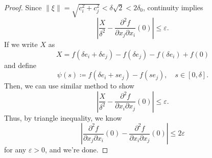\begin{proof}
    Since \(\lVert \xi  \rVert = \sqrt{c_i^2 + c_j^2} < \delta \sqrt{2} < 2 \delta _0   \), continuity implies 
    \[
        \left\vert \frac{X}{\delta ^2} - \frac{\partial^2 f}{\partial x_j \partial x_i}(0)  \right\vert \le \varepsilon. 
    \]
    If we write \(X\) as 
    \[
        X = f(\delta e_i + \delta e_j) - f(\delta e_j) - f(\delta e_i) + f(0)
    \] 
    and define 
    \[
        \psi (s) \coloneqq f(\delta e_i + s e_j) - f(s e_j), \quad s \in [0, \delta ].
    \]
    Then, we can use similar method to show 
    \[
        \left\vert \frac{X}{\delta ^2} - \frac{\partial^2 f }{\partial x_i \partial x_j} (0) \right\vert \le \varepsilon. 
    \]
    Thus, by triangle inequality, we know 
    \[
       \left\vert \frac{\partial^2 f }{\partial x_j \partial x_i} (0) - \frac{\partial^2 f }{\partial x_i \partial x_j} (0) \right\vert \le 2 \varepsilon 
    \] for any \(\varepsilon > 0\), and we're done. 
\end{proof}